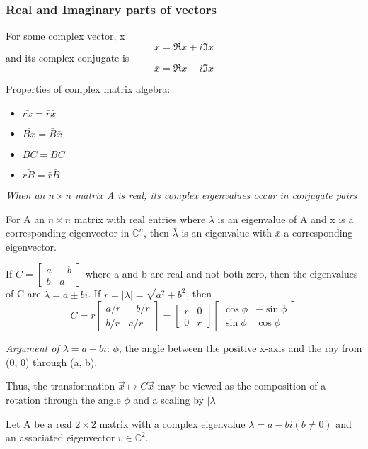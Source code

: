 \documentclass[12pt]{article} %
\begin{document}
\subsubsection{Real and Imaginary parts of vectors}
For some complex vector, x
$$x = \Re x + i \Im x$$
and its complex conjugate is 
$$\bar{x} = \Re x - i \Im x$$

Properties of complex matrix algebra:
\begin{itemize}
	\item $\bar{rx} = \bar{r} \bar{x}$
	\item $\bar{Bx} = \bar{B} \bar{x}$
	\item $\bar{BC} = \bar{B} \bar{C}$
	\item $\bar{rB} = \bar{r} \bar{B}$
\end{itemize}


\emph{When an $n \times n$ matrix A is real, its complex eigenvalues occur in conjugate pairs}

For A an $n \times n$ matrix with real entries where $\lambda$ is an eigenvalue of A and x is a corresponding eigenvector in $\mathbb{C}^n$, then $\bar{\lambda}$ is an eigenvalue with $\bar{x}$ a corresponding eigenvector.

If $C = \begin{bmatrix}
	a & -b\\
	b & a
\end{bmatrix}$ where a and b are real and not both zero, then the eigenvalues of C are $\lambda = a \pm bi$. If $r = |\lambda| = \sqrt{a^2 + b^2}$, then 
$$C = r\begin{bmatrix}
	a/r & -b/r\\
	b/r & a/r
\end{bmatrix} = \begin{bmatrix}
	r & 0\\
	0 & r
\end{bmatrix} \begin{bmatrix}
	\cos \phi & -\sin \phi\\
	\sin \phi & \cos \phi
\end{bmatrix}$$

\emph{Argument of $\lambda = a + bi$}: $\phi$, the angle between the positive x-axis and the ray from (0, 0) through (a, b). 

Thus, the transformation $\vec{x} \mapsto C\vec{x}$ may be viewed as the composition of a rotation through the angle $\phi$ and a scaling by $|\lambda|$

Let A be a real $2 \times 2$ matrix with a complex eigenvalue $\lambda = a - bi (b \neq 0)$ and an associated eigenvector $v \in \mathbb{C}^2$. 
\end{document}
